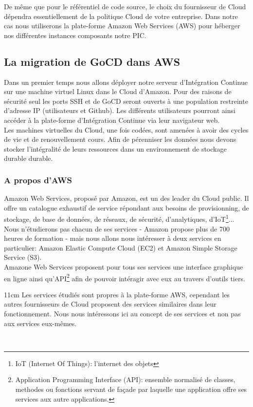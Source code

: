       De même que pour le référentiel de code source, le choix du fournisseur de Cloud dépendra essentiellement de la politique Cloud de votre entreprise. Dans notre cas nous utiliserons la plate-forme Amazon Web Services (AWS) pour héberger nos différentes instances composants notre PIC.

      \subsection{La migration de GoCD dans AWS}
      Dans un premier temps nous allons déployer notre serveur d'Intégration Continue sur une machine virtuel Linux dans le Cloud d'Amazon. Pour des raisons de sécurité seul les ports SSH et de GoCD seront ouverts à une population restreinte d'adresse IP (utilisateurs et Github). Les différents utilisateurs pourront ainsi accéder à la plate-forme d'Intégration Continue via leur navigateur web.\\

      Les machines virtuelles du Cloud, une fois codées, sont amenées à avoir des cycles de vie et de renouvellement cours. Afin de pérenniser les données nous devons stocker l'intégralité de leurs ressources dans un environnement de stockage durable durable.

        \subsubsection{A propos d'AWS}
        Amazon Web Services, proposé par Amazon, est un des leader du Cloud public. Il offre un catalogue exhaustif de service répondant aux besoins de provisionning, de stockage, de base de données, de réseaux, de sécurité, d'analytiques, d'IoT\footnote{IoT (Internet Of Things): l'internet des objets}... Nous n'étudierons pas chacun de ses services - Amazon propose plus de 700 heures de formation - mais nous allons nous intéresser à deux services en particulier: Amazon Elastic Compute Cloud (EC2) et Amazon Simple Storage Service (S3).\\

        Amazone Web Services proposent pour tous ses services une interface graphique en ligne ainsi qu'API\footnote{Application Programming Interface (API): ensemble normalisé de classes, methodes ou fonctions servant de façade par laquelle une application offre ses services aux autre applications.} afin de pouvoir intéragir avec eux au travers d'outils tiers.\\

        \begin {boxedminipage} {11cm}
          Les services étudiés sont propres à la plate-forme AWS, cependant les autres fournisseurs de Cloud proposent des services similaires dans leur fonctionnement. Nous nous intéressons ici au concept de ses services et non pas aux services eux-mêmes.
        \end {boxedminipage}\\

